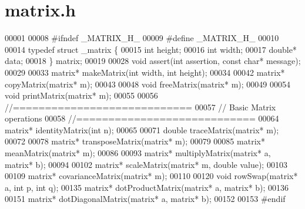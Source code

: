 \section{matrix.\+h}
\label{matrix_8h_source}

\begin{DoxyCode}
00001 
00008 \textcolor{preprocessor}{#ifndef \_MATRIX\_H\_}
00009 \textcolor{preprocessor}{#define \_MATRIX\_H\_}
00010 
00014 \textcolor{keyword}{typedef} \textcolor{keyword}{struct }_matrix \{
00015     \textcolor{keywordtype}{int} height;
00016     \textcolor{keywordtype}{int} width;
00017     \textcolor{keywordtype}{double}* data;
00018 \} matrix;
00019 
00028 \textcolor{keywordtype}{void} assert(\textcolor{keywordtype}{int} assertion, \textcolor{keyword}{const} \textcolor{keywordtype}{char}* message);
00029 
00033 matrix* makeMatrix(\textcolor{keywordtype}{int} width, \textcolor{keywordtype}{int} height);
00034 
00042 matrix* copyMatrix(matrix* m);
00043 
00048 \textcolor{keywordtype}{void} freeMatrix(matrix* m);
00049 
00054 \textcolor{keywordtype}{void} printMatrix(matrix* m);
00055 
00056 \textcolor{comment}{//============================}
00057 \textcolor{comment}{// Basic Matrix operations}
00058 \textcolor{comment}{//============================}
00064 \textcolor{comment}{}matrix* identityMatrix(\textcolor{keywordtype}{int} n);
00065 
00071 \textcolor{keywordtype}{double} traceMatrix(matrix* m);
00072 
00078 matrix* transposeMatrix(matrix* m);
00079 
00085 matrix* meanMatrix(matrix* m);
00086 
00093 matrix* multiplyMatrix(matrix* a, matrix* b);
00094 
00102 matrix* scaleMatrix(matrix* m, \textcolor{keywordtype}{double} value);
00103 
00109 matrix* covarianceMatrix(matrix* m);
00110 
00120 \textcolor{keywordtype}{void} rowSwap(matrix* a, \textcolor{keywordtype}{int} p, \textcolor{keywordtype}{int} q);
00135 matrix* dotProductMatrix(matrix* a, matrix* b);
00136 
00151 matrix* dotDiagonalMatrix(matrix* a, matrix* b);
00152 
00153 \textcolor{preprocessor}{#endif}
\end{DoxyCode}
